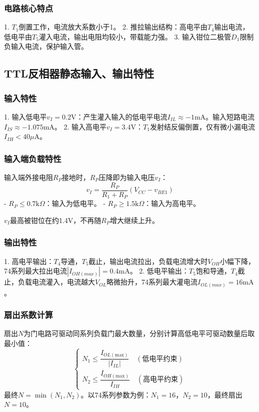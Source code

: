 \subsubsection{电路核心特点}
1. \(T_1\)倒置工作，电流放大系数小于1。
2. 推拉输出结构：高电平由\(T_4\)输出电流，低电平由\(T_5\)灌入电流，输出电阻均较小，带载能力强。
3. 输入钳位二极管\(D_1\)限制负输入电流，保护输入管。

\subsection{TTL反相器静态输入、输出特性}
\subsubsection{输入特性}
1. 输入低电平\(v_I=0.2\mathrm{V}\)：产生灌入输入的低电平电流\(I_{IL}\approx-1\mathrm{mA}\)。输入短路电流\(I_{IS}\approx-1.075\mathrm{mA}\)。
2. 输入高电平\(v_I=3.4\mathrm{V}\)：\(T_1\)发射结反偏倒置，仅有微小漏电流\(I_{IH}<40\mu\mathrm{A}\)。

\subsubsection{输入端负载特性}
输入端外接电阻\(R_P\)接地时，\(R_P\)压降即为输入电压\(v_I\)：
\[
v_I=\frac{R_P}{R_1+R_P}(V_{CC}-v_{BE1})
\]
- \(R_P \leq 0.7\mathrm{k}\Omega\)：输入为低电平。
- \(R_P \geq 1.5\mathrm{k}\Omega\)：输入为高电平。

\(v_I\)最高被钳位在约1.4V，不再随\(R_P\)增大继续上升。

\subsubsection{输出特性}
1. 高电平输出：\(T_4\)导通，\(T_5\)截止，输出电流拉出，负载电流增大时\(V_{OH}\)小幅下降，74系列最大拉出电流\(|I_{OH(max)}|=0.4\mathrm{mA}\)。
2. 低电平输出：\(T_5\)饱和导通，\(T_4\)截止，负载电流灌入，电流越大\(V_{OL}\)略微抬升，74系列最大灌电流\(I_{OL(max)}=16\mathrm{mA}\)。

\subsubsection{扇出系数计算}
扇出\(N\)为门电路可驱动同系列负载门最大数量，分别计算高低电平可驱动数量后取最小值：
\[
\begin{cases}
N_1 \leq \dfrac{I_{OL(\text{max})}}{|I_{IL}|} \quad (\text{低电平约束})\\[4pt]
N_2 \leq \dfrac{I_{OH(\text{max})}}{I_{IH}} \quad (\text{高电平约束})
\end{cases}
\]
最终\(N=\min(N_1,N_2)\)。以74系列参数为例：\(N_1=16\)，\(N_2=10\)，最终扇出\(N=10\)。

